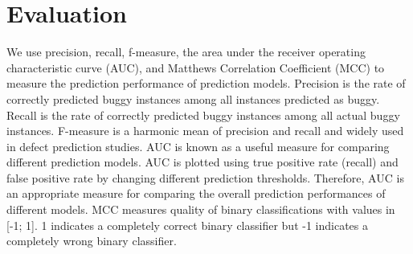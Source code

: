 \section{ Evaluation}
\label{sec:auc}
We use precision, recall, f-measure, the area under the receiver operating characteristic curve (AUC), and Matthews Correlation Coefficient (MCC) to measure the prediction performance of prediction models.
Precision is the rate of correctly predicted buggy instances among all instances predicted as buggy.
Recall is the rate of correctly predicted buggy instances among all actual buggy instances.
F-measure is a harmonic mean of precision and recall and widely used in defect prediction studies.
AUC is known as a useful measure for comparing different prediction models.
AUC is plotted using true positive rate (recall) and false positive rate by changing different prediction thresholds. %
Therefore, AUC is an appropriate measure for comparing the overall prediction performances of different models. 
MCC measures quality of binary classifications with values in [-1; 1]. 1 indicates a completely correct binary classifier but -1 indicates a completely wrong binary classifier.
